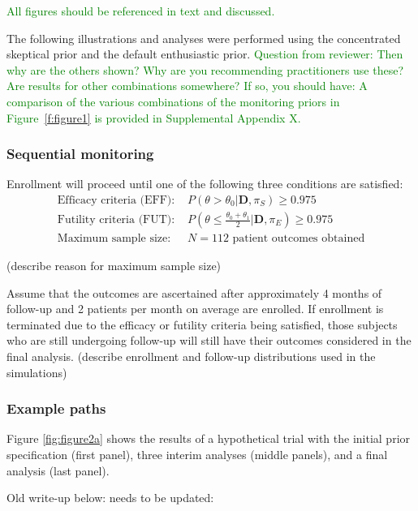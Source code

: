 \documentclass[12pt]{article}
\begin{document}
\textcolor{green}{All figures should be referenced in text and discussed.}


 

The following illustrations and analyses were performed using the concentrated skeptical prior and the default enthusiastic prior.
\textcolor{green}{Question from reviewer: Then why are the others shown? Why are you recommending practitioners use these? Are results for other combinations somewhere?
%
If so, you should have: A comparison of the various combinations of the monitoring priors in Figure~\ref{f:figure1} is provided in Supplemental Appendix X.}
\subsubsection{Sequential monitoring}
Enrollment will proceed until one of the following three conditions are satisfied:
\begin{align*}
\text{Efficacy criteria (EFF): }&P(\theta>\theta_0|\mathbf{D},\pi_S)\geq 0.975\\
\text{Futility criteria (FUT): }&P\left(\theta\leq\frac{\theta_0+\theta_1}{2} \Big|\mathbf{D},\pi_E\right)\geq 0.975\\
\text{Maximum sample size: }&N=112 \text{ patient outcomes obtained}
\end{align*}

(describe reason for maximum sample size)

Assume that the outcomes are ascertained after approximately 4 months of follow-up and 2 patients per month on average are enrolled. If enrollment is terminated due to the efficacy or futility criteria being satisfied, those subjects who are still undergoing follow-up will still have their outcomes considered in the final analysis. (describe enrollment and follow-up distributions used in the simulations)

\subsubsection{Example paths}
Figure \ref{fig:figure2a} shows the results of a hypothetical trial with the initial prior specification (first panel), three interim analyses (middle panels), and a final analysis (last panel).

Old write-up below: needs to be updated:
\end{document}
